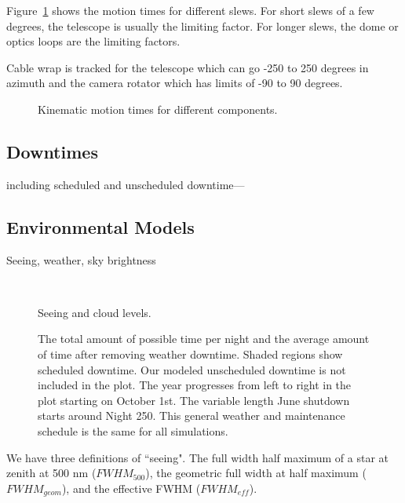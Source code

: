 \documentclass[]{aastex631}
\begin{document}
Figure~\ref{fig:motion_times} shows the motion times for different slews. For short slews of a few degrees, the telescope is usually the limiting factor. For longer slews, the dome or optics loops are the limiting factors. 

Cable wrap is tracked for the telescope which can go -250 to 250 degrees in azimuth and the camera rotator which has limits of -90 to 90 degrees. 

\begin{figure}
    \caption{Kinematic motion times for different components.  \label{fig:motion_times}}
\end{figure}

\subsection{Downtimes}

including scheduled and unscheduled downtime---


\subsection{Environmental Models}
Seeing, weather, sky brightness

\begin{figure}
    \centering
     \\
    \caption{Seeing and cloud levels.}
    \label{fig:seeing_clouds}
\end{figure}


\begin{figure}
    \centering
    \caption{The total amount of possible time per night and the average amount of time
after removing weather downtime. Shaded regions show scheduled downtime. Our modeled
unscheduled downtime is not included in the plot. The year progresses from left to right in
the plot starting on October 1st. The variable length June shutdown starts around Night
250. This general weather and maintenance schedule is the same for all simulations.}
    \label{fig:downtime}
\end{figure}

We have three definitions of ``seeing". The full width half maximum of a star at zenith at 500 nm ($FWHM_{500}$), the geometric full width at half maximum ($FWHM_{geom}$), and the effective FWHM ($FWHM_{eff}$).
\end{document}
